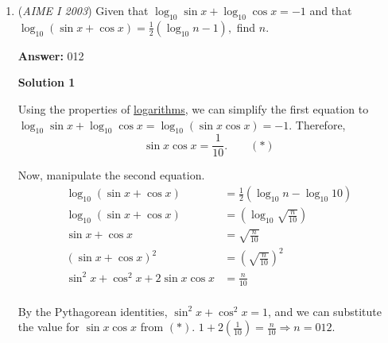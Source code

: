 \begin{enumerate}
\textbf{Solution}

Thinking of this problem algorithmically, one can "sort" the array to give:
 \[{1, 2, 3, 5, 8, 13, 21, 34}\]

 Now, notice that when we consider different pairs, we are only going to fixate one element and look at the all of the next elements in the array, basically the whole $j = i + 1$ shebang. Then, we see that if we set the sum of the whole array to $x,$ we get out answer to be

 
 \[(x-1) + (x-3) + (x-6) + (x-11) + (x-19) + (x-32) + (x-53) = 7x - 125\]

 Finding $7x$ isn't hard, and we see that it is equal to $609$:

 
 \[609 - 125 = \boxed{484}\]



	\item (\textit{AIME I 2003}) Given that $\log_{10} \sin x + \log_{10} \cos x = -1$ and that $\log_{10} (\sin x + \cos x) = \frac{1}{2} (\log_{10} n - 1),$ find $n.$

 \textbf{Answer: }012



\textbf{Solution 1}

Using the properties of \href{https://artofproblemsolving.com/wiki/index.php?title=Logarithm}{logarithms}, we can simplify the first equation to $\log_{10} \sin x + \log_{10} \cos x = \log_{10}(\sin x \cos x) = -1$. Therefore, 
 \[\sin x \cos x = \frac{1}{10}.\qquad (*)\]

 Now, manipulate the second equation.
 \begin{align*} \log_{10} (\sin x + \cos x) &= \frac{1}{2}(\log_{10} n - \log_{10} 10) \\ \log_{10} (\sin x + \cos x) &= \left(\log_{10} \sqrt{\frac{n}{10}}\right) \\ \sin x + \cos x &= \sqrt{\frac{n}{10}} \\ (\sin x + \cos x)^{2} &= \left(\sqrt{\frac{n}{10}}\right)^2 \\ \sin^2 x + \cos^2 x +2 \sin x \cos x &= \frac{n}{10} \\ \end{align*}


 By the Pythagorean identities, $\sin ^2 x + \cos ^2 x = 1$, and we can substitute the value for $\sin x \cos x$ from $(*)$. $1 + 2\left(\frac{1}{10}\right) = \frac{n}{10} \Longrightarrow n = \boxed{012}$.

 




\end{enumerate}
